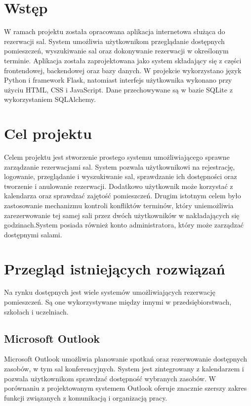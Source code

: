 \documentclass[times]{san}
\begin{document}
\maketitlepage
\spistresci

\section{Wstęp}

W ramach projektu została opracowana aplikacja internetowa służąca do rezerwacji sal. System umożliwia użytkownikom przeglądanie dostępnych pomieszczeń, wyszukiwanie sal oraz dokonywanie rezerwacji w określonym terminie.
Aplikacja została zaprojektowana jako system składający się z części frontendowej, backendowej oraz bazy danych. W projekcie wykorzystano język Python i framework Flask, natomiast interfejs użytkownika wykonano przy użyciu HTML, CSS i JavaScript. Dane przechowywane są w bazie SQLite z wykorzystaniem SQLAlchemy.


\section{Cel projektu}

Celem projektu jest stworzenie prostego systemu umożliwiającego sprawne zarządzanie rezerwacjami sal. System pozwala użytkownikowi na rejestrację, logowanie, przeglądanie i wyszukiwanie sal, sprawdzanie ich dostępności oraz tworzenie i anulowanie rezerwacji. Dodatkowo użytkownik może korzystać z kalendarza oraz sprawdzać zajętość pomieszczeń.
Drugim istotnym celem było zastosowanie mechanizmu kontroli konfliktów terminów, który uniemożliwia zarezerwowanie tej samej sali przez dwóch użytkowników w nakładających się godzinach.System posiada również konto administratora, który może zarządzać dostępnymi salami.

\section{Przegląd istniejących rozwiązań}

Na rynku dostępnych jest wiele systemów umożliwiających rezerwację pomieszczeń. Są one wykorzystywane między innymi w przedsiębiorstwach, szkołach i uczelniach.



\subsection{Microsoft Outlook}
Microsoft Outlook umożliwia planowanie spotkań oraz rezerwowanie dostępnych zasobów, w tym sal konferencyjnych. System jest zintegrowany z kalendarzem i pozwala użytkownikom sprawdzać dostępność wybranych zasobów.
W porównaniu z projektowanym systemem Outlook oferuje znacznie szerszy zakres funkcji związanych z komunikacją i organizacją pracy.
\end{document}
